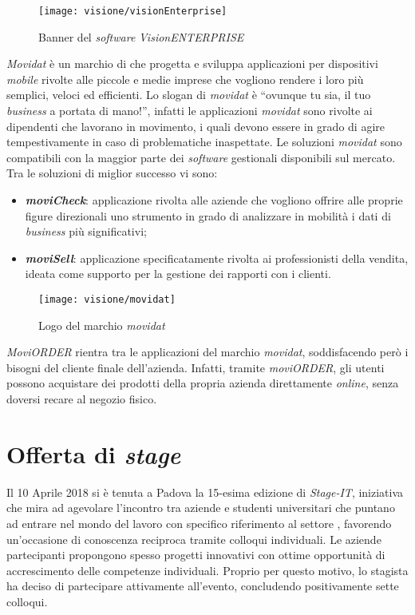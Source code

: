 \begin{figure}[!h] 
    \centering 
    \texttt{[image: visione/visionEnterprise]} 
    \caption{Banner del \textit{software} \textit{VisionENTERPRISE}}
\end{figure}

\textit{Movidat} è un marchio di \visione{} che progetta e sviluppa applicazioni per dispositivi \textit{mobile} rivolte alle piccole e medie imprese che vogliono rendere i loro  più semplici, veloci ed efficienti. Lo slogan di \textit{movidat} è ``ovunque tu sia, il tuo \textit{business} a portata di mano!'', infatti le applicazioni \textit{movidat} sono rivolte ai dipendenti che lavorano in movimento, i quali devono essere in grado di agire tempestivamente in caso di problematiche inaspettate. Le soluzioni \textit{movidat} sono compatibili con la maggior parte dei \textit{software} gestionali disponibili sul mercato. Tra le soluzioni di miglior successo vi sono:
\begin{itemize}
	\item \textbf{\textit{moviCheck}}: applicazione rivolta alle aziende che vogliono offrire alle proprie figure direzionali uno strumento in grado di analizzare in mobilità i dati di \textit{business} più significativi;
	\item \textbf{\textit{moviSell}}: applicazione specificatamente rivolta ai professionisti della vendita, ideata come supporto per la gestione dei rapporti con i clienti.
\end{itemize}

\begin{figure}[!h] 
    \centering 
    \texttt{[image: visione/movidat]} 
    \caption{Logo del marchio \textit{movidat}}
\end{figure}

\textit{MoviORDER} rientra tra le applicazioni del marchio \textit{movidat}, soddisfacendo però i bisogni del cliente finale dell'azienda. Infatti, tramite \textit{moviORDER}, gli utenti possono acquistare dei prodotti della propria azienda direttamente \textit{online}, senza doversi recare al negozio fisico.

\section{Offerta di \textit{stage}}

Il 10 Aprile 2018 si è tenuta a Padova la 15-esima edizione di \textit{Stage-IT}, iniziativa che mira ad agevolare l'incontro tra aziende e studenti universitari che puntano ad entrare nel mondo del lavoro con specifico riferimento al settore , favorendo un'occasione di conoscenza reciproca tramite colloqui individuali. Le aziende partecipanti propongono spesso progetti innovativi con ottime opportunità di accrescimento delle competenze individuali. Proprio per questo motivo, lo stagista ha deciso di partecipare attivamente all'evento, concludendo positivamente sette colloqui. 

